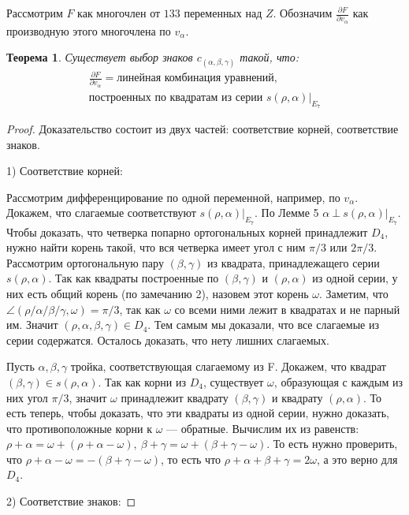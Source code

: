 \documentclass[a4paper,12pt]{amsart}
\theoremstyle{plain}
\newtheorem{theorem}{Теорема}
\theoremstyle{remark}
\theoremstyle{definition}
\begin{document}
Рассмотрим $F$ как многочлен от $133$ переменных над $Z$.
Обозначим $\frac{\partial F}{\partial v_{\alpha}}$ как производную этого многочлена по $v_{\alpha}$.
\begin{theorem}
Существует выбор знаков $c_{(\alpha,\beta,\gamma)}$ такой, что:
    \begin{multline*}
        \frac{\partial F}{\partial v_{\alpha}} = \text{линейная комбинация уравнений},\\
         \text{построенных по квадратам из серии } s(\rho, \alpha)|_{E_7}
    \end{multline*}
\end{theorem}
\begin{proof}
Доказательство состоит из двух частей: соответствие корней, соответствие знаков. 

1) Соответствие корней:
 
 Рассмотрим дифференцирование по одной переменной, например, по $v_\alpha$. Докажем, что слагаемые соответствуют $s(\rho,\alpha)|_{E_7}$. По Лемме 5 $\alpha ~\bot~ s(\rho,\alpha)|_{E_7}$. Чтобы доказать, что четверка попарно ортогональных корней принадлежит $D_4$, нужно найти корень такой, что вся четверка имеет угол с ним $\pi/3$  или $2\pi/3$. Рассмотрим ортогональную пару $(\beta,\gamma)$ из квадрата, принадлежащего серии $s(\rho,\alpha)$. Так как квадраты построенные по $(\beta,\gamma) \text{ и } (\rho,\alpha)$ из одной серии, у них есть общий корень (по замечанию 2), назовем этот корень $\omega$. Заметим, что $\angle(\rho/\alpha/\beta/\gamma,\omega)=\pi/3$, так как $\omega$ со всеми ними лежит в квадратах и не парный им. Значит $(\rho,\alpha,\beta,\gamma)\in D_4$. Тем самым мы доказали, что все слагаемые из серии содержатся. Осталось доказать, что нету лишних слагаемых.

Пусть $\alpha,\beta,\gamma$ тройка, соответствующая слагаемому из F. Докажем, что квадрат $(\beta,\gamma) \in s(\rho,\alpha)$. Так как корни из $D_4$, существует $\omega$, образующая с каждым из них угол $\pi/3$, значит $\omega$ принадлежит квадрату $(\beta,\gamma)$ и квадрату $(\rho,\alpha)$. То есть теперь, чтобы доказать, что эти квадраты из одной серии, нужно доказать, что противоположные корни к $\omega$ --- обратные. Вычислим их из равенств: $\rho + \alpha = \omega + (\rho + \alpha - \omega), ~ \beta + \gamma = \omega + (\beta + \gamma - \omega)$. То есть нужно проверить, что $\rho + \alpha - \omega = -(\beta + \gamma - \omega)$, то есть что $\rho+\alpha+\beta+\gamma = 2\omega$, а это верно для $D_4$.

2) Соответствие знаков:


\end{proof}
\end{document}
